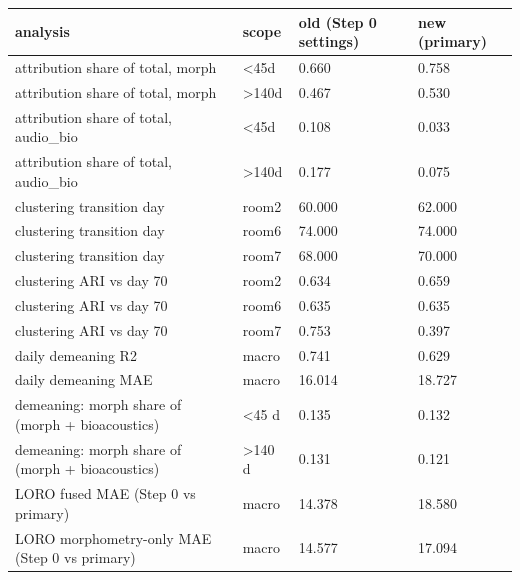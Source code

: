 \begin{tabular}{llll}
\hline
analysis & scope & old (Step 0 settings) & new (primary) \\
\hline
attribution share of total, morph & <45d & 0.660 & 0.758 \\
attribution share of total, morph & >140d & 0.467 & 0.530 \\
attribution share of total, audio\_bio & <45d & 0.108 & 0.033 \\
attribution share of total, audio\_bio & >140d & 0.177 & 0.075 \\
clustering transition day & room2 & 60.000 & 62.000 \\
clustering transition day & room6 & 74.000 & 74.000 \\
clustering transition day & room7 & 68.000 & 70.000 \\
clustering ARI vs day 70 & room2 & 0.634 & 0.659 \\
clustering ARI vs day 70 & room6 & 0.635 & 0.635 \\
clustering ARI vs day 70 & room7 & 0.753 & 0.397 \\
daily demeaning R2 & macro & 0.741 & 0.629 \\
daily demeaning MAE & macro & 16.014 & 18.727 \\
demeaning: morph share of (morph + bioacoustics) & <45 d & 0.135 & 0.132 \\
demeaning: morph share of (morph + bioacoustics) & >140 d & 0.131 & 0.121 \\
LORO fused MAE (Step 0 vs primary) & macro & 14.378 & 18.580 \\
LORO morphometry-only MAE (Step 0 vs primary) & macro & 14.577 & 17.094 \\
\hline
\end{tabular}

